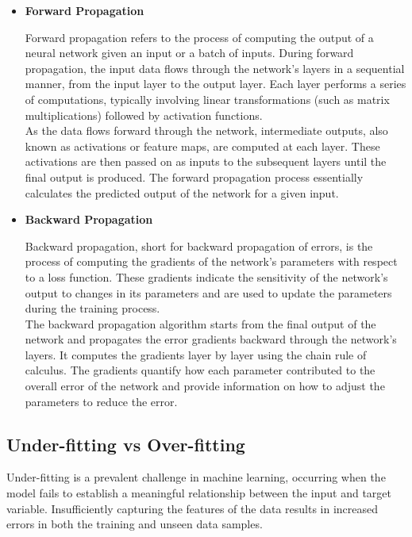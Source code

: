 \begin{itemize}

\item \textbf{Forward Propagation}

Forward propagation refers to the process of computing the output of a neural network given an input or a batch of inputs. During forward propagation, the input data flows through the network's layers in a sequential manner, from the input layer to the output layer. Each layer performs a series of computations, typically involving linear transformations (such as matrix multiplications) followed by activation functions. \\

As the data flows forward through the network, intermediate outputs, also known as activations or feature maps, are computed at each layer. These activations are then passed on as inputs to the subsequent layers until the final output is produced. The forward propagation process essentially calculates the predicted output of the network for a given input.

\item \textbf{Backward Propagation}

Backward propagation, short for backward propagation of errors, is the process of computing the gradients of the network's parameters with respect to a loss function. These gradients indicate the sensitivity of the network's output to changes in its parameters and are used to update the parameters during the training process. \\

The backward propagation algorithm starts from the final output of the network and propagates the error gradients backward through the network's layers. It computes the gradients layer by layer using the chain rule of calculus. The gradients quantify how each parameter contributed to the overall error of the network and provide information on how to adjust the parameters to reduce the error.

\end{itemize}

\subsection{Under-fitting vs Over-fitting}

Under-fitting is a prevalent challenge in machine learning, occurring when the model fails to establish a meaningful relationship between the input and target variable. Insufficiently capturing the features of the data results in increased errors in both the training and unseen data samples. \\

